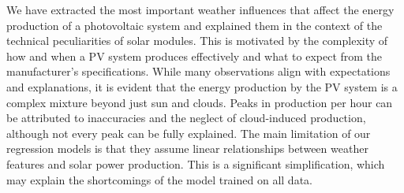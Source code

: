 \documentclass{article}
\begin{document}
We have extracted the most important weather influences that affect the energy production of a photovoltaic system and explained them in the context of the technical peculiarities of solar modules. This is motivated by the complexity of how and when a PV system produces effectively and what to expect from the manufacturer's specifications. While many observations align with expectations and explanations, it is evident that the energy production by the PV system is a complex mixture beyond just sun and clouds. Peaks in production per hour can be attributed to inaccuracies and the neglect of cloud-induced production, although not every peak can be fully explained. The main limitation of our regression models is that they assume linear relationships between weather features and solar power production. This is a significant simplification, which may explain the shortcomings of the model trained on all data.




\end{document}
